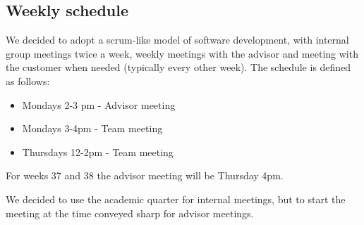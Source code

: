 \documentclass[11pt,a4paper,titlepage,oneside]{report}
\begin{document}
\subsection{Weekly schedule}
We decided to adopt a scrum-like model of software development, with internal group meetings twice a week, weekly meetings with the advisor and meeting with the customer when needed (typically every other week). The schedule is defined as follows:
\begin{itemize}
\item Mondays 2-3 pm - Advisor meeting
\item Mondays 3-4pm - Team meeting
\item Thursdays 12-2pm - Team meeting
\end{itemize}
For weeks 37 and 38 the advisor meeting will be Thursday 4pm.

We decided to use the academic quarter for internal meetings, but to start the meeting at the time conveyed sharp for advisor meetings.
\end{document}
